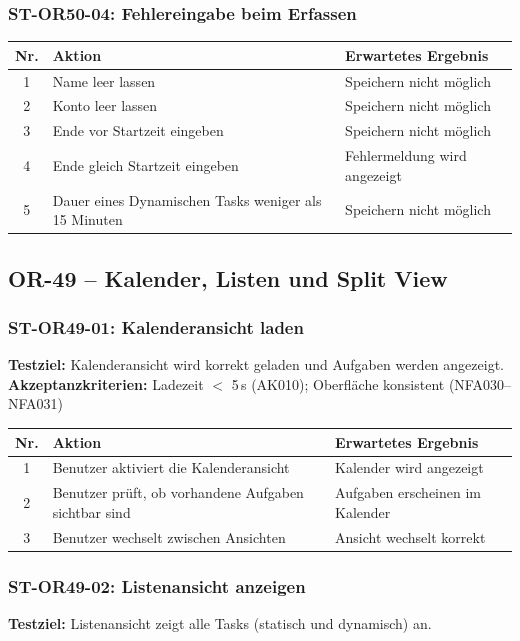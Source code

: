 \documentclass[a4paper,11pt]{article}
\begin{document}
\subsubsection*{ST-OR50-04: Fehlereingabe beim Erfassen}
\begin{longtable}{cp{5.5cm}p{5.5cm}}
    \toprule
    \textbf{Nr.} & \textbf{Aktion} & \textbf{Erwartetes Ergebnis} \\
    \midrule
    1 & Name leer lassen & Speichern nicht möglich \\
    2 & Konto leer lassen & Speichern nicht möglich \\
    3 & Ende vor Startzeit eingeben & Speichern nicht möglich \\
    4 & Ende gleich Startzeit eingeben & Fehlermeldung wird angezeigt \\
    5 & Dauer eines Dynamischen Tasks weniger als 15 Minuten & Speichern nicht möglich \\
    \bottomrule
\end{longtable}

\subsection{OR-49 -- Kalender, Listen und Split View}

\subsubsection*{ST-OR49-01: Kalenderansicht laden}
\textbf{Testziel:} Kalenderansicht wird korrekt geladen und Aufgaben werden angezeigt. \\
\textbf{Akzeptanzkriterien:} Ladezeit $<$ 5\,s (AK010); Oberfläche konsistent (NFA030--NFA031)

\begin{longtable}{cp{5.5cm}p{5.5cm}}
    \toprule
    \textbf{Nr.} & \textbf{Aktion} & \textbf{Erwartetes Ergebnis} \\
    \midrule
    1 & Benutzer aktiviert die Kalenderansicht & Kalender wird angezeigt \\
    2 & Benutzer prüft, ob vorhandene Aufgaben sichtbar sind & Aufgaben erscheinen im Kalender \\
    3 & Benutzer wechselt zwischen Ansichten & Ansicht wechselt korrekt \\
    \bottomrule
\end{longtable}

\subsubsection*{ST-OR49-02: Listenansicht anzeigen}
\textbf{Testziel:} Listenansicht zeigt alle Tasks (statisch und dynamisch) an.
\end{document}
